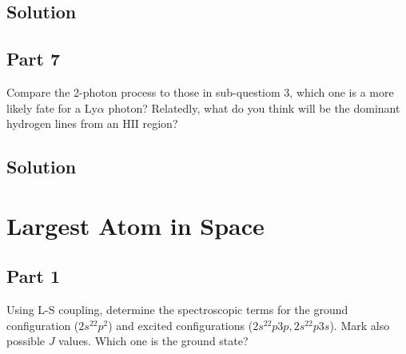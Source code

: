 \documentclass[12pt]{article}
\begin{document}

\subsection*{Solution}




\subsection*{Part 7}

Compare the 2-photon process to those in sub-questiom 3, which one is a more likely fate for a Ly$\alpha$ photon? Relatedly, what do you think will be the dominant hydrogen lines from an $\mathrm{HII}$ region?


\subsection*{Solution}






\section{Largest Atom in Space }



\subsection*{Part 1}

Using L-S coupling, determine the spectroscopic terms for the ground configuration ($2s^22p^2$) and excited configurations ($2s^22p3p, 2s^22p3s$). Mark also possible $J$ values. Which one is the ground state?
\end{document}
